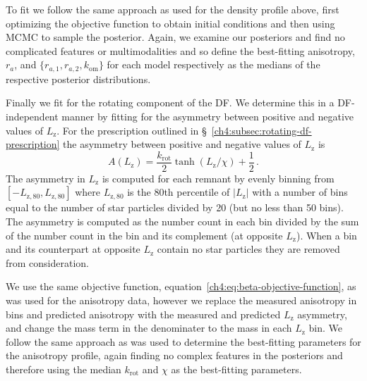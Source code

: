 To fit we follow the same approach as used for the density profile above, first optimizing the objective function to obtain initial conditions and then using MCMC to sample the posterior. Again, we examine our posteriors and find no complicated features or multimodalities and so define the best-fitting anisotropy, $r_{a}$, and $\{ r_{a,1},r_{a,2},k_\mathrm{om} \}$ for each model respectively as the medians of the respective posterior distributions.



Finally we fit for the rotating component of the DF. We determine this in a DF-independent manner by fitting for the asymmetry between positive and negative values of $L_{\mathrm{z}}$. For the prescription outlined in \S~\ref{ch4:subsec:rotating-df-prescription} the asymmetry between positive and negative values of $L_{\mathrm{z}}$ is
\begin{equation}
    \label{ch4:eq:Lz-anisotropy}
    A(L_{\mathrm{z}}) = \frac{k_\mathrm{rot}}{2} \tanh(L_{\mathrm{z}}/\chi) + \frac{1}{2}\,.
\end{equation}
\noindent The asymmetry in $L_{\mathrm{z}}$ is computed for each remnant by evenly binning from $[-L_{\mathrm{z},80},L_{\mathrm{z},80}]$ where $L_{\mathrm{z},80}$ is the 80th percentile of $\lvert L_{\mathrm{z}} \rvert$ with a number of bins equal to the number of star particles divided by 20 (but no less than 50 bins). The asymmetry is computed as the number count in each bin divided by the sum of the number count in the bin and its complement (at opposite $L_{\mathrm{z}}$). When a bin and its counterpart at opposite $L_{\mathrm{z}}$ contain no star particles they are removed from consideration. 

We use the same objective function, equation~\eqref{ch4:eq:beta-objective-function}, as was used for the anisotropy data, however we replace the measured anisotropy in bins and predicted anisotropy with the measured and predicted $L_{\mathrm{z}}$ asymmetry, and change the mass term in the denominater to the mass in each $L_{\mathrm{z}}$ bin. We follow the same approach as was used to determine the best-fitting parameters for the anisotropy profile, again finding no complex features in the posteriors and therefore using the median $k_\mathrm{rot}$ and $\chi$ as the best-fitting parameters.

